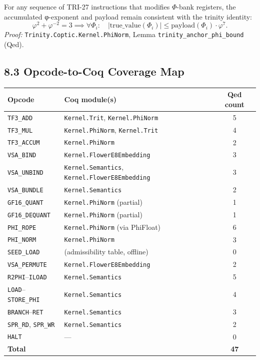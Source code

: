 \begin{theorem}
\label{thm:trinity-anchor}
For any sequence of TRI-27 instructions that modifies $\Phi$-bank
registers, the accumulated φ-exponent and payload remain
consistent with the trinity identity:
\[
\varphi^2 + \varphi^{-2} = 3 \implies \forall \Phi_i: \quad |\text{true\_value}(\Phi_i)| \leq \text{payload}(\Phi_i) \cdot \varphi^7.
\]
\emph{Proof:} \texttt{Trinity.Coptic.Kernel.PhiNorm}, Lemma
\texttt{trinity\_anchor\_phi\_bound} (Qed).
\end{theorem}

\subsection{8.3 Opcode-to-Coq Coverage Map}\label{fa_71:coverage-map}

\begin{longtable}[]{@{}llc@{}}
\toprule\noalign{}
Opcode & Coq module(s) & Qed count \\
\midrule\noalign{}
\endhead
\bottomrule\noalign{}
\endlastfoot
\texttt{TF3\_ADD} & \texttt{Kernel.Trit}, \texttt{Kernel.PhiNorm} & 5 \\
\texttt{TF3\_MUL} & \texttt{Kernel.PhiNorm}, \texttt{Kernel.Trit} & 4 \\
\texttt{TF3\_ACCUM} & \texttt{Kernel.PhiNorm} & 2 \\
\texttt{VSA\_BIND} & \texttt{Kernel.FlowerE8Embedding} & 3 \\
\texttt{VSA\_UNBIND} & \texttt{Kernel.Semantics}, \texttt{Kernel.FlowerE8Embedding} & 3 \\
\texttt{VSA\_BUNDLE} & \texttt{Kernel.Semantics} & 2 \\
\texttt{GF16\_QUANT} & \texttt{Kernel.PhiNorm} (partial) & 1 \\
\texttt{GF16\_DEQUANT} & \texttt{Kernel.PhiNorm} (partial) & 1 \\
\texttt{PHI\_ROPE} & \texttt{Kernel.PhiNorm} (via PhiFloat) & 6 \\
\texttt{PHI\_NORM} & \texttt{Kernel.PhiNorm} & 3 \\
\texttt{SEED\_LOAD} & (admissibility table, offline) & 0 \\
\texttt{VSA\_PERMUTE} & \texttt{Kernel.FlowerE8Embedding} & 2 \\
\texttt{R2PHI}--\texttt{ILOAD} & \texttt{Kernel.Semantics} & 5 \\
\texttt{LOAD}--\texttt{STORE\_PHI} & \texttt{Kernel.Semantics} & 4 \\
\texttt{BRANCH}--\texttt{RET} & \texttt{Kernel.Semantics} & 3 \\
\texttt{SPR\_RD}, \texttt{SPR\_WR} & \texttt{Kernel.Semantics} & 2 \\
\texttt{HALT} & --- & 0 \\
\midrule\noalign{}
\textbf{Total} & & \textbf{47} \\
\end{longtable}

